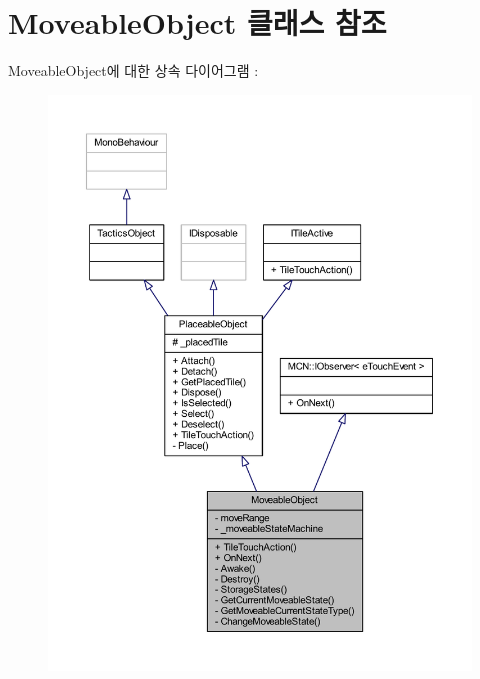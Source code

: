 \hypertarget{class_moveable_object}{}\section{Moveable\+Object 클래스 참조}
\label{class_moveable_object}


Moveable\+Object에 대한 상속 다이어그램 \+: \nopagebreak
\begin{figure}[H]
\begin{center}
\leavevmode
\includegraphics[width=350pt]{class_moveable_object__inherit__graph}
\end{center}
\end{figure}


